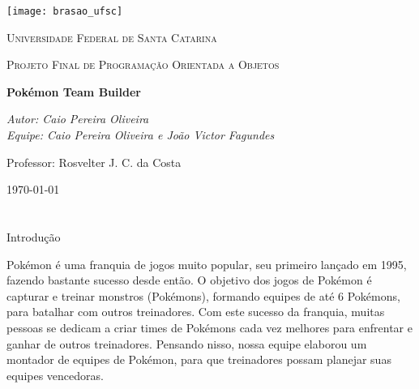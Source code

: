 \documentclass[
	article,			%
	12pt,				%
	oneside,			%
	a4paper,			%
	english,			%
	brazil,				%
	sumario=tradicional
	]{abntex2}
\begin{document}

\frenchspacing 


%
%


\begin{center}

\texttt{[image: brasao\_ufsc]}\par\vspace{1cm}
{\scshape\LARGE Universidade Federal de Santa Catarina \par}
\vspace{1cm}
{\scshape\Large Projeto Final de Programação Orientada a Objetos\par}
\vspace{1.5cm}
{\huge\bfseries Pokémon Team Builder\par}
\vspace{2cm}
{\Large\itshape Autor: Caio Pereira Oliveira\\Equipe: Caio Pereira Oliveira e João Victor Fagundes\par}
\vfill
{\Large Professor: Rosvelter J. C. da Costa}

\vspace{\fill}
{\large \today\par}

\end{center}

\textual

\newpage
\section*{}

\begin{center}
{\HUGE Introdução}
\end{center}

Pokémon é uma franquia de jogos muito popular, seu primeiro lançado em 1995, fazendo bastante sucesso desde então. O objetivo dos jogos de Pokémon é capturar e treinar monstros (Pokémons), formando equipes de até 6 Pokémons, para batalhar com outros treinadores. Com este sucesso da franquia, muitas pessoas se dedicam a criar times de Pokémons cada vez melhores para enfrentar e ganhar de outros treinadores. Pensando nisso, nossa equipe elaborou um montador de equipes de Pokémon, para que treinadores possam planejar suas equipes vencedoras.
\end{document}
